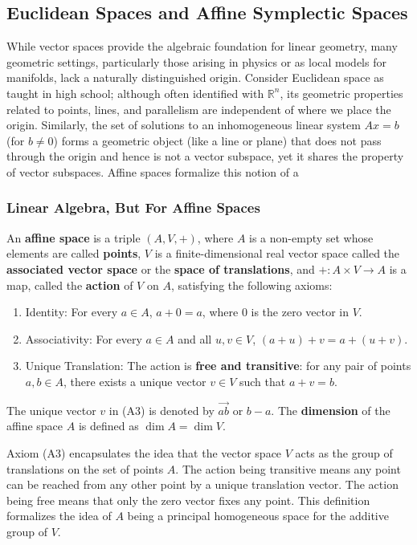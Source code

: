 \subsection{Euclidean Spaces and Affine Symplectic Spaces}
While vector spaces provide the algebraic foundation for linear geometry, many geometric settings, particularly those arising in physics or as local models for manifolds, lack a naturally distinguished origin. Consider Euclidean space as taught in high school; although often identified with $\mathbb{R}^n$, its geometric properties related to points, lines, and parallelism are independent of where we place the origin. Similarly, the set of solutions to an inhomogeneous linear system $Ax = b$ (for $b \neq 0$) forms a geometric object (like a line or plane) that does not pass through the origin and hence is not a vector subspace, yet it shares the  property of vector subspaces. Affine spaces formalize this notion of a 

\subsubsection{Linear Algebra, But For Affine Spaces}

\begin{definition}
An \textbf{affine space} is a triple $(A, V, +)$, where $A$ is a non-empty set whose elements are called \textbf{points}, $V$ is a finite-dimensional real vector space called the \textbf{associated vector space} or the \textbf{space of translations}, and $+: A \times V \to A$ is a map, called the \textbf{action} of $V$ on $A$, satisfying the following axioms:
\begin{enumerate}
    \item[(A1)] Identity: For every $a \in A$, $a + 0 = a$, where $0$ is the zero vector in $V$.
    \item[(A2)] Associativity: For every $a \in A$ and all $u, v \in V$, $(a + u) + v = a + (u + v)$.
    \item[(A3)] Unique Translation: The action is \textbf{free and transitive}: for any pair of points $a, b \in A$, there exists a unique vector $v \in V$ such that $a + v = b$.
\end{enumerate}
The unique vector $v$ in (A3) is denoted by $\vec{ab}$ or $b - a$. The \textbf{dimension} of the affine space $A$ is defined as $\dim A = \dim V$.
\end{definition}

Axiom (A3) encapsulates the idea that the vector space $V$ acts as the group of translations on the set of points $A$. The action being transitive means any point can be reached from any other point by a unique translation vector. The action being free means that only the zero vector fixes any point. This definition formalizes the idea of $A$ being a principal homogeneous space for the additive group of $V$.

